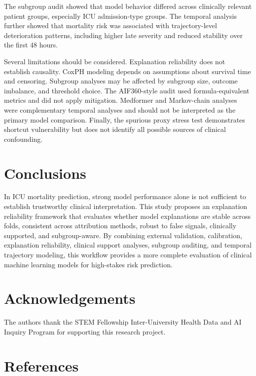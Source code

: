 \documentclass[10pt,twocolumn,letterpaper]{article}
\begin{document}
The subgroup audit showed that model behavior differed across clinically relevant patient groups, especially ICU admission-type groups. The temporal analysis further showed that mortality risk was associated with trajectory-level deterioration patterns, including higher late severity and reduced stability over the first 48 hours.

Several limitations should be considered. Explanation reliability does not establish causality. CoxPH modeling depends on assumptions about survival time and censoring. Subgroup analyses may be affected by subgroup size, outcome imbalance, and threshold choice. The AIF360-style audit used formula-equivalent metrics and did not apply mitigation. Medformer and Markov-chain analyses were complementary temporal analyses and should not be interpreted as the primary model comparison. Finally, the spurious proxy stress test demonstrates shortcut vulnerability but does not identify all possible sources of clinical confounding.

\section{Conclusions}

In ICU mortality prediction, strong model performance alone is not sufficient to establish trustworthy clinical interpretation. This study proposes an explanation reliability framework that evaluates whether model explanations are stable across folds, consistent across attribution methods, robust to false signals, clinically supported, and subgroup-aware. By combining external validation, calibration, explanation reliability, clinical support analyses, subgroup auditing, and temporal trajectory modeling, this workflow provides a more complete evaluation of clinical machine learning models for high-stakes risk prediction.

\section*{Acknowledgements}

The authors thank the STEM Fellowship Inter-University Health Data and AI Inquiry Program for supporting this research project.

\section*{References}

\end{document}
